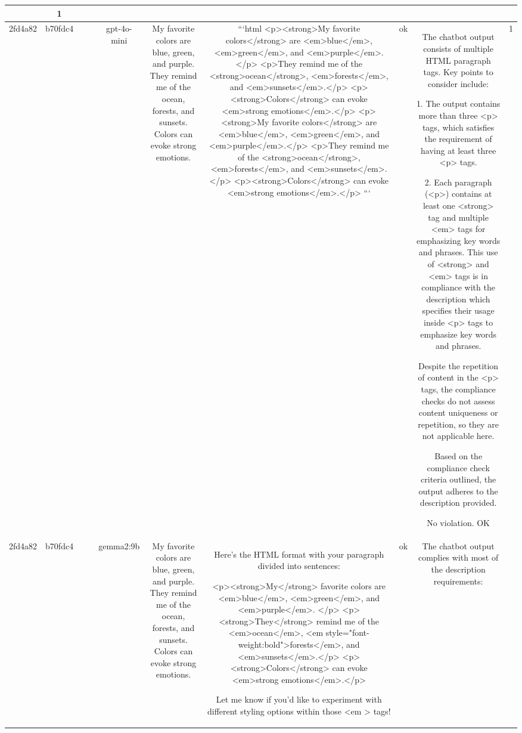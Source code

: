 \begin{table}[h!]
\begin{tabular}{|c|c|c|c|c|c|c|c|c|c|}
{{ERR & 1\\
\hline
2fd4a82 & b70fdc4 &  &  & gpt-4o-mini & My favorite colors are blue, green, and purple. They remind me of the ocean, forests, and sunsets. Colors can evoke strong emotions. & ```html
<p><strong>My favorite colors</strong> are <em>blue</em>, <em>green</em>, and <em>purple</em>.</p>
<p>They remind me of the <strong>ocean</strong>, <em>forests</em>, and <em>sunsets</em>.</p>
<p><strong>Colors</strong> can evoke <em>strong emotions</em>.</p>
<p><strong>My favorite colors</strong> are <em>blue</em>, <em>green</em>, and <em>purple</em>.</p>
<p>They remind me of the <strong>ocean</strong>, <em>forests</em>, and <em>sunsets</em>.</p>
<p><strong>Colors</strong> can evoke <em>strong emotions</em>.</p>
``` & ok & The chatbot output consists of multiple HTML paragraph tags. Key points to consider include:

1. The output contains more than three <p> tags, which satisfies the requirement of having at least three <p> tags.

2. Each paragraph (<p>) contains at least one <strong> tag and multiple <em> tags for emphasizing key words and phrases. This use of <strong> and <em> tags is in compliance with the description which specifies their usage inside <p> tags to emphasize key words and phrases.

Despite the repetition of content in the <p> tags, the compliance checks do not assess content uniqueness or repetition, so they are not applicable here.

Based on the compliance check criteria outlined, the output adheres to the description provided.

No violation.
OK & 1\\
\hline
2fd4a82 & b70fdc4 &  &  & gemma2:9b & My favorite colors are blue, green, and purple. They remind me of the ocean, forests, and sunsets. Colors can evoke strong emotions. & Here's the HTML format with your paragraph divided into sentences:

<p><strong>My</strong> favorite colors are <em>blue</em>, <em>green</em>, and <em>purple</em>. </p>
<p><strong>They</strong> remind me of the <em>ocean</em>, <em style="font-weight:bold">forests</em>, and <em>sunsets</em>.</p> 
<p><strong>Colors</strong> can evoke <em>strong emotions</em>.</p>



Let me know if you'd like to experiment with different styling options within those <em > tags! & ok & The chatbot output complies with most of the description requirements:

}}
\end{tabular}
\end{table}
